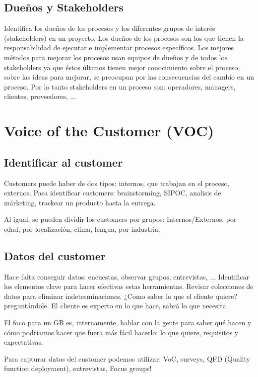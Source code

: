 \documentclass[]{article}
\begin{document}
\subsection{Dueños y Stakeholders}

Identifica los dueños de los procesos y los diferentes grupos de interés (stakeholders) en un proyecto.
Los dueños de los procesos son los que tienen la responsabilidad de ejecutar e implementar procesos específicos. Los mejores métodos para mejorar los procesos usan equipos de dueños y de todos los stakeholders ya que éstos últimos tienen mejor conocimiento sobre el proceso, sobre las ideas para mejorar, se preocupan por las consecuencias del cambio en un proceso. Por lo tanto stakeholders en un proceso son: operadores, managers, clientes, proveedores, ...

\section{Voice of the Customer (VOC)}

\subsection{Identificar al customer}
Customers puede haber de dos tipos: internos, que trabajan en el proceso, externos. Pasa identificar customers: brainstorming, SIPOC, analisis de márketing, trackear un producto hasta la entrega.

Al igual, se pueden dividir los customers por grupos: Internos/Externos, por edad, por localización, clima, lengua, por industria.

\subsection{Datos del customer}

Hace falta conseguir datos: encuestas, observar grupos, entrevistas, ... Identificar los elementos clave para hacer efectivas estas herramientas. Revisar colecciones de datos para eliminar indeterminaciones.
¿Como saber lo que el cliente quiere? preguntándole. El cliente es experto en lo que hace, sabrá lo que necesita. 

El foco para un GB es, internamente, hablar con la gente para saber qué hacen y cómo podríamos hacer que fuera más fácil hacerlo: lo que quiere, requisitos y expectativas. 

Para capturar datos del customer podemos utilizar: VoC, surveys, QFD (Quality function deployment), entrevistas, Focus groups!
\end{document}
